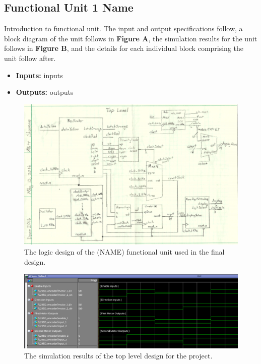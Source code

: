\documentclass[a4paper]{article}
\begin{document}
\clearpage





\subsection{Functional Unit 1 Name}
Introduction to functional unit. The input and output specifications follow, a block diagram of the unit follows in \textbf{Figure A}, the simulation results for the unit follows in \textbf{Figure B}, and the details for each individual block comprising the unit follow after.
\begin{itemize}
  \item \textbf{Inputs:  } inputs
  \item \textbf{Outputs: } outputs
\end{itemize}
\begin{figure}[h]
  \centering
    \includegraphics[width=.8\textwidth]{images/functional_1.png}
	\caption{The logic design of the (NAME) functional unit used in the final design.}
    \label{fig:functional-1}
\end{figure}
\begin{figure}[h]
  \centering
    \includegraphics[width=.98\textwidth]{sims/functional_1.png}
	\caption{The simulation results of the top level design for the project.}
    \label{fig:top-level-sim}
\end{figure}
\end{document}
